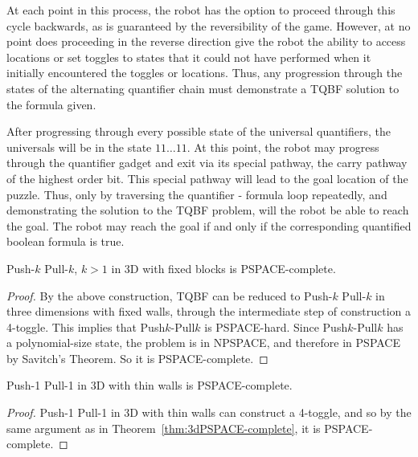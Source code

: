 At each point in this process, the robot has the option to proceed through this cycle backwards, as is
guaranteed by the reversibility of the game. However, at no point does proceeding in the reverse direction
give the robot the ability to access locations or set toggles to states that it could not have performed
when it initially encountered the toggles or locations. Thus, any progression through the states of the
alternating quantifier chain must demonstrate a TQBF solution to the formula given.

After progressing through every possible state of the universal quantifiers, the universals will be in the
state $11 \ldots 11$. At this point, the robot may progress through the quantifier gadget and exit via its special
pathway,
the carry pathway of the highest order bit. This special pathway will lead to the goal location of the puzzle.
Thus, only by traversing the quantifier - formula loop repeatedly, and demonstrating the solution to the TQBF
problem,
will the robot be able to reach the goal. The robot may reach the goal if and only if the corresponding quantified
boolean formula is true.

\begin{theorem}
    \label{thm:3dPSPACE-complete}
    Push-$k$ Pull-$k$, $k>1$ in 3D with fixed blocks is PSPACE-complete.
\end{theorem}
\begin{proof}
By the above construction, TQBF can be reduced to Push-$k$ Pull-$k$ in three dimensions with fixed walls, through the intermediate step of construction a 4-toggle. This implies that Push$k$-Pull$k$ is PSPACE-hard.
Since Push$k$-Pull$k$ has a polynomial-size state, the problem is in NPSPACE, and therefore in PSPACE by Savitch's Theorem\cite{SAVITCH1970177}. So it is PSPACE-complete.
\end{proof}

\begin{theorem}
    Push-1 Pull-1 in 3D with thin walls is PSPACE-complete.
\end{theorem}
\begin{proof}
    Push-1 Pull-1 in 3D with thin walls can construct a 4-toggle, and so by the same argument as in Theorem~\ref{thm:3dPSPACE-complete}, it is PSPACE-complete.
\end{proof}
